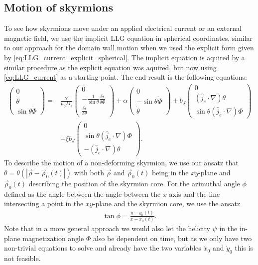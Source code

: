 \documentclass[12pt, a4paper, twoside, openright]{article}		%
\numberwithin{equation}{section}
\begin{document}
\subsection{Motion of skyrmions} \label{sec:SkyrmionMotion}
To see how skyrmions move under an applied electrical current or an external magnetic field, we use the implicit LLG equation in spherical coordinates, similar to our approach for the domain wall motion when we used the explicit form given by \eqref{eq:LLG_current_explicit_spherical}. The implicit equation is aquired by a similar procedure as the explicit equation was aquired, but now using \eqref{eq:LLG_current} as a starting point. The end result is the following equations:
\begin{align}
\nonumber \begin{pmatrix}
0 \\ \dot{\theta} \\ \sin\theta\dot{\Phi}
\end{pmatrix} =
&\frac{\gamma'}{\mu_0 M_s}
\begin{pmatrix}
0 \\ -\frac{1}{\sin\theta} \frac{\delta \epsilon}{\delta \Phi} \\ \frac{\delta \epsilon}{\delta \theta}
\end{pmatrix} + \alpha
\begin{pmatrix}
0 \\ -\sin\theta\dot{\Phi} \\ \dot{\theta}
\end{pmatrix} + b_J
\begin{pmatrix}
0 \\ (\hat{j}_e\cdot\nabla)\theta \\ \sin\theta(\hat{j}_e\cdot\nabla)\Phi
\end{pmatrix} \\
&+\xi b_J
\begin{pmatrix}
0 \\ \sin\theta(\hat{j}_e\cdot\nabla)\Phi \\ -(\hat{j}_e\cdot\nabla)\theta
\end{pmatrix}.
\label{eq:LLG_current_implicit_spherical}
\end{align}
To describe the motion of a non-deforming skyrmion, we use our ansatz that\\ $\theta = \theta(|\vec{\rho}-\vec{\rho}_0(t)|)$ with both $\vec{\rho}$ and $\vec{\rho}_0(t)$ being in the $xy$-plane and $\vec{\rho}_0(t)$ describing the position of the skyrmion core. For the azimuthal angle $\phi$ defined as the angle between the angle between the $x$-axis and the line intersecting a point in the $xy$-plane and the skyrmion core, we use the ansatz
\begin{align}
\tan\phi = \frac{y-y_0(t)}{x-x_0(t)}.
\end{align}
Note that in a more general approach we would also let the helicity $\psi$ in the in-plane magnetization angle $\Phi$ also be dependent on time, but as we only have two non-trivial equations to solve and already have the two variables $\dot{x}_0$ and $\dot{y}_0$ this is not feasible.
\end{document}
